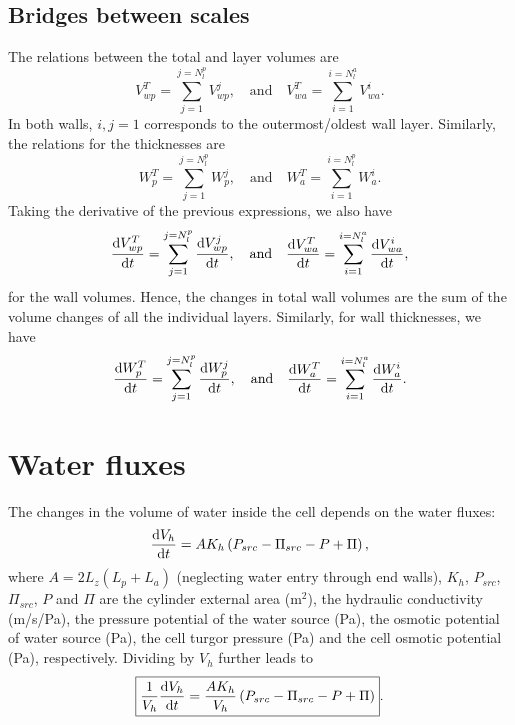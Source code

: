 \documentclass[]{article}
\begin{document}
\subsection{Bridges between scales}
The relations between the total and layer volumes are
\begin{equation}
	V_{wp}^T=\sum_{j=1}^{j=N_l^p}V_{wp}^j, 
	\quad\text{and}\quad
	V_{wa}^T=\sum_{i=1}^{i=N_l^a}V_{wa}^i.
\end{equation}
In both walls, $i,j=1$ corresponds to the outermost/oldest wall layer. Similarly, the relations for the thicknesses are
\begin{equation}
	W_{p}^T=\sum_{j=1}^{j=N_l^p}W_{p}^j, 
	\quad\text{and}\quad
	W_{a}^T=\sum_{i=1}^{i=N_l^p}W_{a}^i.
\end{equation}
Taking the derivative of the previous expressions, we also have
\begin{equation}
	\frac{{\rm d} V_{wp}^T}{{\rm d} t}=\sum_{j=1}^{j=N_l^p}\frac{{\rm d} V_{wp}^j}{{\rm d} t}, 
	\quad\text{and}\quad
	\frac{{\rm d} V_{wa}^T}{{\rm d} t}=\sum_{i=1}^{i=N_l^a}\frac{{\rm d} V_{wa}^i}{{\rm d} t},
\end{equation}
for the wall volumes. Hence, the changes in total wall volumes are the sum of the volume changes of all the individual layers. Similarly, for wall thicknesses, we have
\begin{equation}
	\frac{{\rm d} W_{p}^T}{{\rm d} t}=\sum_{j=1}^{j=N_l^p}\frac{{\rm d} W_{p}^j}{{\rm d} t}, 
	\quad\text{and}\quad
	\frac{{\rm d} W_{a}^T}{{\rm d} t}=\sum_{i=1}^{i=N_l^a}\frac{{\rm d} W_{a}^i}{{\rm d} t}.
\end{equation}
\section{Water fluxes}
The changes in the volume of water inside the cell depends on the water fluxes:
\begin{equation}
	\frac{{\rm d} V_h}{{\rm d} t}=AK_h\left(P_{src} - \Pi_{src} -P + \Pi \right),
\end{equation}
where $A=2L_z(L_p+L_a)$ (neglecting water entry through end walls), $K_h$, $P_{src}$, $\Pi_{src}$, $P$ and $\Pi$ are the cylinder external area (m$^2$), the hydraulic conductivity (m/s/Pa), the pressure potential of the water source (Pa), the osmotic potential of water source (Pa), the cell turgor pressure (Pa) and the cell osmotic potential (Pa), respectively.
Dividing by $V_h$ further leads to
\begin{equation}
	\boxed{
		\frac{1}{V_h}\frac{{\rm d} V_h}{{\rm d} t}=\frac{AK_h}{V_h}\left(P_{src} - \Pi_{src} -P + \Pi \right)}.
\end{equation}
\end{document}
